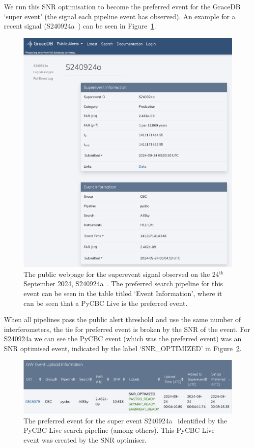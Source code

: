 We run this SNR optimisation to become the preferred event for the GraceDB `super event' (the \gwadj signal each pipeline event has observed). An example for a recent \gwadj signal (S240924a~\cite{superevent_S240924a}) can be seen in Figure~\ref{7:fig:gracedb_pref_event}.
%
\begin{figure}
    \centering
    \includegraphics[width=1.0\linewidth]{images/7_snr_optimiser/gracedb_public_snr_optimiser.png}
    \caption{The public webpage for the superevent \gwadj signal observed on the 24$^{\text{th}}$ September 2024, S240924a~\cite{superevent_S240924a}. The preferred search pipeline for this event can be seen in the table titled `Event Information', where it can be seen that a PyCBC Live is the preferred event.}
    \label{7:fig:gracedb_pref_event}
\end{figure}
%
When all pipelines pass the public alert threshold and use the same number of interferometers, the tie for preferred event is broken by the SNR of the event. For S240924a we can see the PyCBC event (which was the preferred event) was an SNR optimised event, indicated by the label `SNR\_OPTIMIZED' in Figure~\ref{7:fig:gracedb_snr_optimizer}.
%
\begin{figure}
    \centering
    \includegraphics[width=1.0\linewidth]{images/7_snr_optimiser/gracedb_pycbc_pref_event.png}
    \caption{The preferred event for the super event S240924a~\cite{superevent_S240924a} identified by the PyCBC Live search pipeline (among others). This PyCBC Live event was created by the SNR optimiser.}
    \label{7:fig:gracedb_snr_optimizer}
\end{figure}
%

